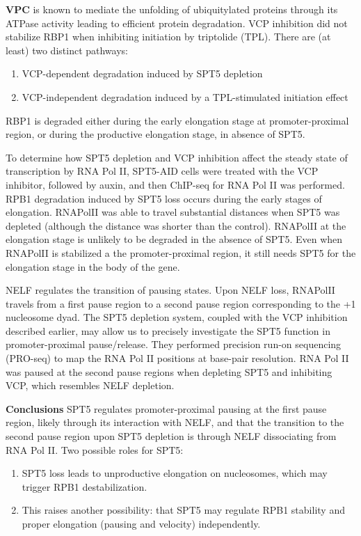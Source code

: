 \textbf{VPC} is known to mediate the unfolding of ubiquitylated proteins through its ATPase activity leading to efficient protein degradation.
VCP inhibition did not stabilize RBP1 when inhibiting initiation by triptolide (TPL).
There are (at least) two distinct pathways:
\begin{enumerate}
\tightlist
\item VCP-dependent degradation induced by SPT5 depletion
\item VCP-independent degradation induced by a TPL-stimulated initiation effect
\end{enumerate}
RBP1 is degraded either during the early elongation stage at promoter-proximal region, or during the productive elongation stage, in absence of SPT5.

To determine how SPT5 depletion and VCP inhibition affect the steady state of transcription by RNA Pol II, SPT5-AID cells were treated with the VCP inhibitor, followed by auxin, and then ChIP-seq for RNA Pol II was performed. RPB1 degradation induced by SPT5 loss occurs during the early stages of elongation. RNAPolII was able to travel substantial distances when SPT5 was depleted (although the distance was shorter than the control). RNAPolII at the elongation stage is unlikely to be degraded in the absence of SPT5. Even when RNAPolII is stabilized a the promoter-proximal region, it still needs SPT5 for the elongation stage in the body of the gene.

NELF regulates the transition of pausing states. Upon NELF loss, RNAPolII travels from a first pause region to a second pause region corresponding to the +1 nucleosome dyad. The SPT5 depletion system, coupled with the VCP inhibition described earlier, may allow us to precisely
investigate the SPT5 function in promoter-proximal pause/release. They performed precision run-on sequencing (PRO-seq) to map the RNA Pol II positions at base-pair resolution. RNA Pol II was paused at the second pause regions when depleting SPT5 and inhibiting VCP, which resembles NELF depletion.

\textbf{Conclusions}
SPT5 regulates promoter-proximal pausing at the first pause region, likely through its interaction with NELF, and that the transition to the second pause region upon SPT5 depletion is through NELF dissociating from RNA Pol II.
Two possible roles for SPT5:
\begin{enumerate}
\tightlist
\item SPT5 loss leads to unproductive elongation on nucleosomes, which may trigger RPB1 destabilization.
\item This raises another possibility: that SPT5 may regulate RPB1 stability and
proper elongation (pausing and velocity) independently.
\end{enumerate}

